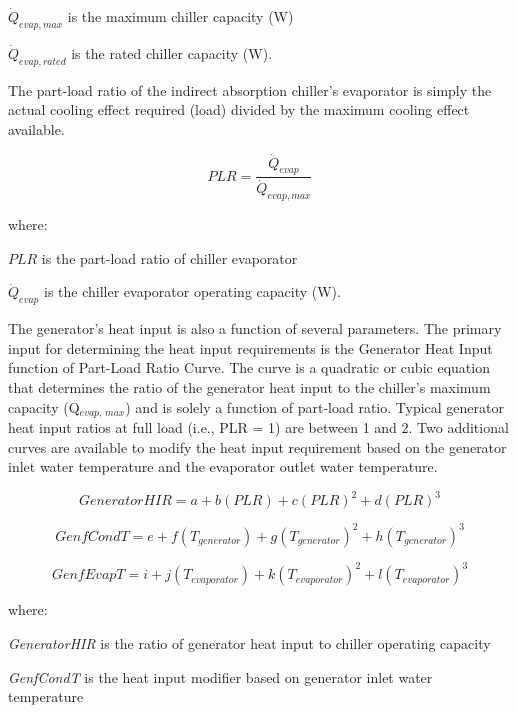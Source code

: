 \({\dot Q_{evap,max}}\) is the maximum chiller capacity (W)

\({\dot Q_{evap,rated}}\) is the rated chiller capacity (W).

The part-load ratio of the indirect absorption chiller's evaporator is simply the actual cooling effect required (load) divided by the maximum cooling effect available.

\begin{equation}
  PLR = \frac{\dot{Q}_{evap}}{\dot{Q}_{evap,max}}
\end{equation}

where:

\(PLR\) is the part-load ratio of chiller evaporator

\({\dot Q_{evap}}\) is the chiller evaporator operating capacity (W).

The generator's heat input is also a function of several parameters. The primary input for determining the heat input requirements is the Generator Heat Input function of Part-Load Ratio Curve. The curve is a quadratic or cubic equation that determines the ratio of the generator heat input to the chiller's maximum capacity (Q\(_{evap,\, max}\)) and is solely a function of part-load ratio. Typical generator heat input ratios at full load (i.e., PLR = 1) are between 1 and 2. Two additional curves are available to modify the heat input requirement based on the generator inlet water temperature and the evaporator outlet water temperature.

\begin{equation}
GeneratorHIR = a + b\left( {PLR} \right) + c{\left( {PLR} \right)^2} + d{\left( {PLR} \right)^3}
\end{equation}

\begin{equation}
GenfCondT = e + f\left( {{T_{generator}}} \right) + g{\left( {{T_{generator}}} \right)^2} + h{\left( {{T_{generator}}} \right)^3}
\end{equation}

\begin{equation}
GenfEvapT = i + j\left( {{T_{evaporator}}} \right) + k{\left( {{T_{evaporator}}} \right)^2} + l{\left( {{T_{evaporator}}} \right)^3}
\end{equation}

where:

\emph{GeneratorHIR} is the ratio of generator heat input to chiller operating capacity

\emph{GenfCondT} is the heat input modifier based on generator inlet water temperature

